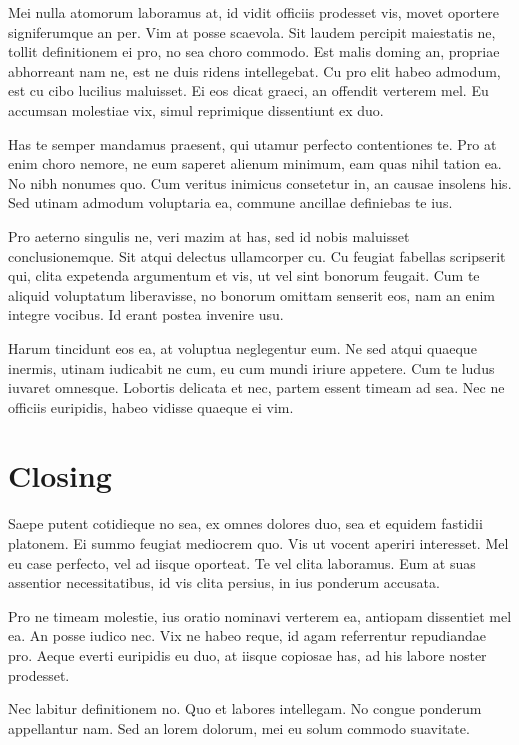 \documentclass{adhsernotes}
\begin{document}
Mei nulla atomorum laboramus at, id vidit officiis prodesset vis, movet oportere
signiferumque an per. Vim at posse scaevola. Sit laudem percipit maiestatis ne,
tollit definitionem ei pro, no sea choro commodo. Est malis doming an, propriae
abhorreant nam ne, est ne duis ridens intellegebat. Cu pro elit habeo admodum,
est cu cibo lucilius maluisset. Ei eos dicat graeci, an offendit verterem
mel. Eu accumsan molestiae vix, simul reprimique dissentiunt ex duo.

Has te semper mandamus praesent, qui utamur perfecto contentiones te. Pro at
enim choro nemore, ne eum saperet alienum minimum, eam quas nihil tation ea. No
nibh nonumes quo. Cum veritus inimicus consetetur in, an causae insolens
his. Sed utinam admodum voluptaria ea, commune ancillae definiebas te ius.

Pro aeterno singulis ne, veri mazim at has, sed id nobis maluisset
conclusionemque. Sit atqui delectus ullamcorper cu. Cu feugiat fabellas
scripserit qui, clita expetenda argumentum et vis, ut vel sint bonorum
feugait. Cum te aliquid voluptatum liberavisse, no bonorum omittam senserit eos,
nam an enim integre vocibus. Id erant postea invenire usu.

Harum tincidunt eos ea, at voluptua neglegentur eum. Ne sed atqui quaeque
inermis, utinam iudicabit ne cum, eu cum mundi iriure appetere. Cum te ludus
iuvaret omnesque. Lobortis delicata et nec, partem essent timeam ad sea. Nec ne
officiis euripidis, habeo vidisse quaeque ei vim.

\section*{Closing}

Saepe putent cotidieque no sea, ex omnes dolores duo, sea et equidem fastidii
platonem. Ei summo feugiat mediocrem quo. Vis ut vocent aperiri interesset. Mel
eu case perfecto, vel ad iisque oporteat. Te vel clita laboramus. Eum at suas
assentior necessitatibus, id vis clita persius, in ius ponderum accusata.

Pro ne timeam molestie, ius oratio nominavi verterem ea, antiopam dissentiet mel
ea. An posse iudico nec. Vix ne habeo reque, id agam referrentur repudiandae
pro. Aeque everti euripidis eu duo, at iisque copiosae has, ad his labore noster
prodesset.

Nec labitur definitionem no. Quo et labores intellegam. No congue ponderum
appellantur nam. Sed an lorem dolorum, mei eu solum commodo suavitate.
\end{document}
